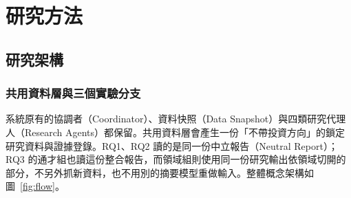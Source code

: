 \clearpage\section{研究方法}

\subsection{研究架構}

\subsubsection{共用資料層與三個實驗分支}

系統原有的協調者（Coordinator）、資料快照（Data Snapshot）與四類研究代理人（Research Agents）都保留。共用資料層會產生一份「不帶投資方向」的鎖定研究資料與證據登錄。RQ1、RQ2 讀的是同一份中立報告（Neutral Report）；RQ3 的通才組也讀這份整合報告，而領域組則使用同一份研究輸出依領域切開的部分，不另外抓新資料，也不用別的摘要模型重做輸入。整體概念架構如圖~\ref{fig:flow}。
